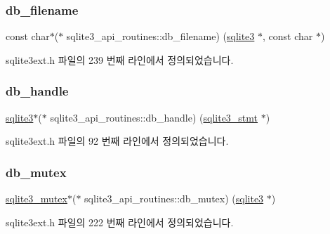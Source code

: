 \subsubsection{\texorpdfstring{db\+\_\+filename}{db\_filename}}
{\footnotesize\ttfamily const char$\ast$($\ast$ sqlite3\+\_\+api\+\_\+routines\+::db\+\_\+filename) (\hyperlink{sqlite3_8h_a0ef6f2646262c8a9b24368d8ac140f69}{sqlite3} $\ast$, const char $\ast$)}



sqlite3ext.\+h 파일의 239 번째 라인에서 정의되었습니다.

\mbox{\label{structsqlite3__api__routines_a202912ed0777c34ef98ab262204d0c6e}} 
\subsubsection{\texorpdfstring{db\+\_\+handle}{db\_handle}}
{\footnotesize\ttfamily \hyperlink{sqlite3_8h_a0ef6f2646262c8a9b24368d8ac140f69}{sqlite3}$\ast$($\ast$ sqlite3\+\_\+api\+\_\+routines\+::db\+\_\+handle) (\hyperlink{sqlite3_8h_af2a033da1327cdd77f0a174a09aedd0c}{sqlite3\+\_\+stmt} $\ast$)}



sqlite3ext.\+h 파일의 92 번째 라인에서 정의되었습니다.

\mbox{\label{structsqlite3__api__routines_a59c84d3d07284820a218921a0c1a9b28}} 
\subsubsection{\texorpdfstring{db\+\_\+mutex}{db\_mutex}}
{\footnotesize\ttfamily \hyperlink{sqlite3_8h_a0f546860bde03fddb33a9fed920da05c}{sqlite3\+\_\+mutex}$\ast$($\ast$ sqlite3\+\_\+api\+\_\+routines\+::db\+\_\+mutex) (\hyperlink{sqlite3_8h_a0ef6f2646262c8a9b24368d8ac140f69}{sqlite3} $\ast$)}



sqlite3ext.\+h 파일의 222 번째 라인에서 정의되었습니다.

\mbox{\label{structsqlite3__api__routines_a192b2ee2b6bd5a57cbb74bf72266a9e7}} 
